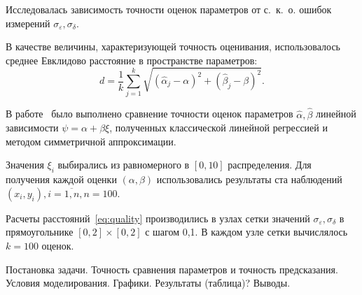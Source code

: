 Исследовалась зависимость точности оценок параметров от с.~к.~о.
ошибок измерений \( \sigma_{\varepsilon}, \sigma_{\delta} \).

В качестве величины, характеризующей точность оценивания,
использовалось среднее Евклидово расстояние в пространстве параметров:
\begin{equation}
  \label{eq:quality}
  d = \frac{1}{k} \sum_{j=1}^k \sqrt{(\hat{\alpha}_j - \alpha)^2 + (\hat{\beta}_j - \beta)^2}.
\end{equation}

В работе~\cite{budny17} было выполнено сравнение точности оценок параметров
\( \hat{\alpha}, \hat{\beta} \) линейной зависимости \( \psi = \alpha + \beta \xi \),
полученных классической линейной регрессией и методом симметричной аппроксимации.

Значения \( \xi_i \) выбирались из равномерного в \( [0, 10] \) распределения.
Для получения каждой оценки \( ( \alpha, \beta ) \) использовались результаты
ста наблюдений \( ( x_i, y_i ), i = \overline{1, n}, n = 100 \).

Расчеты расстояний~\eqref{eq:quality} производились в узлах сетки значений
\( \sigma_{\varepsilon}, \sigma_{\delta} \) в прямоугольнике
\( [0, 2] \times [0, 2] \) с шагом 0{,}1.
В каждом узле сетки вычислялось \( k = 100 \) оценок.


Постановка задачи.
Точность сравнения параметров и точность предсказания.
Условия моделирования.
Графики.
Результаты (таблица)?
Выводы.